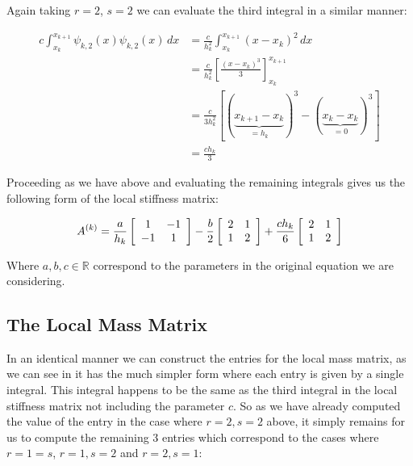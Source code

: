 Again taking $r=2$, $s=2$ we can evaluate the third integral in a similar manner:

\begin{align*}
    c\int_{x_k}^{x_{k+1}}\psi_{k,2}(x)\psi_{k,2}(x)\, dx
       &= \frac{c}{h_k^2}\int_{x_k}^{x_{k + 1}}(x - x_k)^2\, dx \\
       &= \frac{c}{h_k^2}\left[ \frac{(x - x_k)^3}{3} \right]_{x_k}^{x_{k+1}} \\
       &= \frac{c}{3h_k^2}\left[ (\underbrace{x_{k+1} - x_k}_{= h_k})^3
                            -(\underbrace{x_k - x_k}_{=0})^3\right] \\
       &= \frac{ch_k}{3}
\end{align*}

Proceeding as we have above and evaluating the remaining integrals gives us the
following form of the local stiffness matrix:


\begin{equation}\label{eq:oned-determinisitic-local-stiffness}
    A^{(k)} = \frac{a}{h_k}\left[\begin{array}{c c}
                1 & -1 \\ -1 & 1
              \end{array}\right]
              -\frac{b}{2}\left[\begin{array}{c c}
                2 & 1\\ 1 & 2
              \end{array}\right]
              + \frac{ch_k}{6}\left[\begin{array}{c c}
                2 & 1 \\ 1 & 2
              \end{array}\right]
\end{equation}

Where $a,b,c \in \mathbb{R}$ correspond to the parameters in the original
equation  we are considering.

\subsection{The Local Mass Matrix}

In an identical manner we can construct the entries for the local mass matrix,
as we can see in  it has the much
simpler form where each entry is given by a single integral. This integral
happens to be the same as the third integral in the local stiffness matrix not
including the parameter $c$. So as we have already computed  the value of the
entry in the case where $r = 2, s = 2$ above, it simply remains for us to
compute the remaining 3 entries which correspond to the cases where $r = 1 =
s$, $r = 1, s = 2$ and $r = 2, s = 1$:

